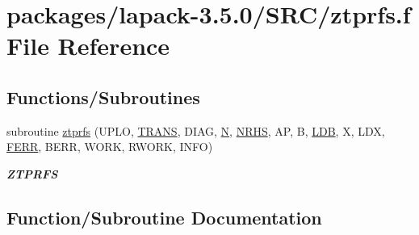 \hypertarget{ztprfs_8f}{}\section{packages/lapack-\/3.5.0/\+S\+R\+C/ztprfs.f File Reference}
\label{ztprfs_8f}
\subsection*{Functions/\+Subroutines}
\begin{DoxyCompactItemize}
\item 
subroutine \hyperlink{ztprfs_8f_a6c2af886b16049fc4b7c78b941308564}{ztprfs} (U\+P\+L\+O, \hyperlink{superlu__enum__consts_8h_a0c4e17b2d5cea33f9991ccc6a6678d62a1f61e3015bfe0f0c2c3fda4c5a0cdf58}{T\+R\+A\+N\+S}, D\+I\+A\+G, \hyperlink{polmisc_8c_a0240ac851181b84ac374872dc5434ee4}{N}, \hyperlink{example__user_8c_aa0138da002ce2a90360df2f521eb3198}{N\+R\+H\+S}, A\+P, B, \hyperlink{example__user_8c_a50e90a7104df172b5a89a06c47fcca04}{L\+D\+B}, X, L\+D\+X, \hyperlink{superlu__enum__consts_8h_af00a42ecad444bbda75cde1b64bd7e72a78fd14d7abebae04095cfbe02928f153}{F\+E\+R\+R}, B\+E\+R\+R, W\+O\+R\+K, R\+W\+O\+R\+K, I\+N\+F\+O)
\begin{DoxyCompactList}\small\item\em {\bfseries Z\+T\+P\+R\+F\+S} \end{DoxyCompactList}\end{DoxyCompactItemize}


\subsection{Function/\+Subroutine Documentation}
\hypertarget{ztprfs_8f_a6c2af886b16049fc4b7c78b941308564}{}
